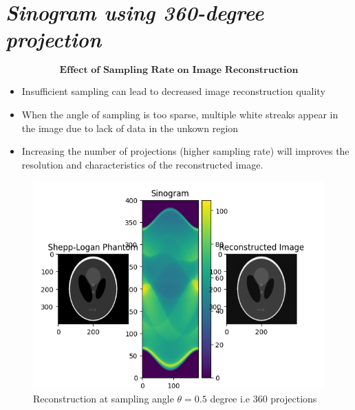 \documentclass{article}
\begin{document}
\section{\textit{Sinogram using 360-degree projection}}
$$\textbf{ Effect of Sampling Rate on Image Reconstruction }$$
\begin{itemize}
    \item Insufficient sampling can lead to decreased image reconstruction quality
    \item When the angle of sampling is too sparse, multiple white streaks appear in the image due to lack of data in the unkown region
    \item Increasing the number of projections (higher sampling rate) will improves the resolution and characteristics of the reconstructed image. 
\end{itemize}
\begin{figure}
    \centering
    \includegraphics[width=0.625\linewidth]{360.png}
    \caption{Reconstruction at sampling angle $\theta=0.5$ degree i.e 360 projections}
    \label{fig:enter-label}
\end{figure}
\end{document}
